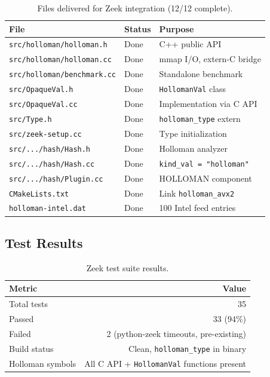 \documentclass[11pt,a4paper]{article}
\begin{document}
\begin{table}[h]
\centering
\begin{tabular}{lll}
\toprule
File & Status & Purpose \\
\midrule
\texttt{src/holloman/holloman.h} & Done & C++ public API \\
\texttt{src/holloman/holloman.cc} & Done & mmap I/O, extern-C bridge \\
\texttt{src/holloman/benchmark.cc} & Done & Standalone benchmark \\
\texttt{src/OpaqueVal.h} & Done & \texttt{HollomanVal} class \\
\texttt{src/OpaqueVal.cc} & Done & Implementation via C API \\
\texttt{src/Type.h} & Done & \texttt{holloman\_type} extern \\
\texttt{src/zeek-setup.cc} & Done & Type initialization \\
\texttt{src/.../hash/Hash.h} & Done & Holloman analyzer \\
\texttt{src/.../hash/Hash.cc} & Done & \texttt{kind\_val = "holloman"} \\
\texttt{src/.../hash/Plugin.cc} & Done & HOLLOMAN component \\
\texttt{CMakeLists.txt} & Done & Link \texttt{holloman\_avx2} \\
\texttt{holloman-intel.dat} & Done & 100 Intel feed entries \\
\bottomrule
\end{tabular}
\caption{Files delivered for Zeek integration (12/12 complete).}
\label{tab:zeek-files}
\end{table}

\subsection{Test Results}

\begin{table}[h]
\centering
\begin{tabular}{lr}
\toprule
Metric & Value \\
\midrule
Total tests & 35 \\
Passed & 33 (94\%) \\
Failed & 2 (python-zeek timeouts, pre-existing) \\
Build status & Clean, \texttt{holloman\_type} in binary \\
Holloman symbols & All C API + \texttt{HollomanVal} functions present \\
\bottomrule
\end{tabular}
\caption{Zeek test suite results.}
\label{tab:zeek-tests}
\end{table}
\end{document}
